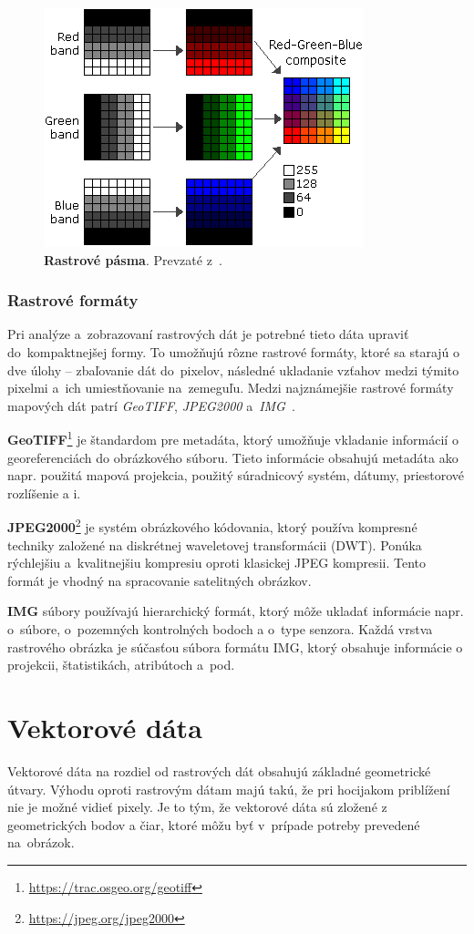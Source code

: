 \begin{figure}[ht]
    \centering
    \includegraphics[width=0.5\linewidth]{obrazky-figures/raster-bands.png}
    \caption{\textbf{Rastrové pásma}. Prevzaté z~\cite{arcgis-desktop}.}
    \label{fig:raster-bands}
\end{figure}

\subsubsection{Rastrové formáty}
Pri analýze a~zobrazovaní rastrových dát je potrebné tieto dáta upraviť do~kompaktnejšej formy. To umožňujú rôzne rastrové formáty, ktoré sa starajú o dve úlohy \--- zbaľovanie dát do~pixelov, následné ukladanie vzťahov medzi týmito pixelmi a~ich umiestňovanie na~zemeguľu. Medzi najznámejšie rastrové formáty mapových dát patrí \emph{GeoTIFF}, \emph{JPEG2000} a~\emph{IMG}~\cite{gis-formats}.

\textbf{GeoTIFF}\footnote{\url{https://trac.osgeo.org/geotiff}} je štandardom pre metadáta, ktorý umožňuje vkladanie informácií o georeferenciách do obrázkového súboru. Tieto informácie obsahujú metadáta ako napr. použitá mapová projekcia, použitý súradnicový systém, dátumy, priestorové rozlíšenie a i.

\textbf{JPEG2000}\footnote{\url{https://jpeg.org/jpeg2000}} je systém obrázkového kódovania, ktorý používa kompresné techniky založené na diskrétnej waveletovej transformácii (DWT). Ponúka rýchlejšiu a~kvalitnejšiu kompresiu oproti klasickej JPEG kompresii. Tento formát je vhodný na spracovanie satelitných obrázkov.

\textbf{IMG} súbory používajú hierarchický formát, ktorý môže ukladať informácie napr. o~súbore, o~pozemných kontrolných bodoch a o~type senzora. Každá vrstva rastrového obrázka je súčasťou súbora formátu IMG, ktorý obsahuje informácie o projekcii, štatistikách, atribútoch a~pod.

\section{Vektorové dáta}
Vektorové dáta na rozdiel od rastrových dát obsahujú základné geometrické útvary. Výhodu oproti rastrovým dátam majú takú, že pri hocijakom priblížení nie je možné vidieť pixely. Je to tým, že vektorové dáta sú zložené z geometrických bodov a čiar, ktoré môžu byť v~prípade potreby prevedené na~obrázok.

